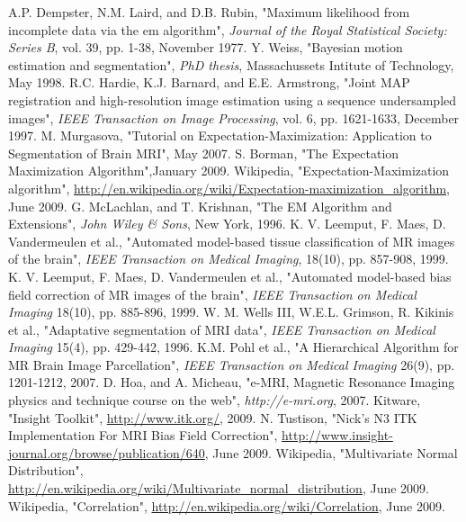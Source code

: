 \begin{thebibliography}{9999}%
%
A.P. Dempster, N.M. Laird, and D.B. Rubin, "Maximum likelihood from incomplete data via the em algorithm", \textsl{Journal of the Royal Statistical Society: Series B}, vol. 39, pp. 1-38, November 1977.
%
Y. Weiss, "Bayesian motion estimation and segmentation", \textsl{PhD thesis}, Massachussets Intitute of Technology, May 1998.
%
R.C. Hardie, K.J. Barnard, and E.E. Armstrong, "Joint MAP registration and high-resolution image estimation using a sequence undersampled images", \textsl{IEEE Transaction on Image Processing}, vol. 6, pp. 1621-1633, December 1997.
%
M. Murgasova, "Tutorial on Expectation-Maximization: Application to Segmentation of Brain MRI", May 2007.
%
S. Borman, "The Expectation Maximization Algorithm",January 2009.
%
Wikipedia, "Expectation-Maximization algorithm", \url{http://en.wikipedia.org/wiki/Expectation-maximization_algorithm}, June 2009.
%
G. McLachlan, and T. Krishnan, "The EM Algorithm and Extensions", \textsl{John Wiley \& Sons}, New York, 1996.
%
K. V. Leemput, F. Maes, D. Vandermeulen et al., "Automated model-based tissue classification of MR images of the brain", \textsl{IEEE Transaction on Medical Imaging}, 18(10), pp. 857-908, 1999.
%
K. V. Leemput, F. Maes, D. Vandermeulen et al., "Automated model-based bias field correction of MR images of the brain", \textsl{IEEE Transaction on Medical Imaging} 18(10), pp. 885-896, 1999.
%
W. M. Wells III, W.E.L. Grimson, R. Kikinis et al., "Adaptative segmentation of MRI data", \textsl{IEEE Transaction on Medical Imaging} 15(4), pp. 429-442, 1996.
%
K.M. Pohl et al., "A Hierarchical Algorithm for MR Brain Image Parcellation", \textsl{IEEE Transaction on Medical Imaging} 26(9), pp. 1201-1212, 2007.
%
D. Hoa, and A. Micheau, "e-MRI, Magnetic Resonance Imaging physics and technique course on the web", \textsl{http://e-mri.org}, 2007.
%
Kitware, "Insight Toolkit", \url{http://www.itk.org/}, 2009.
%
N. Tustison, "Nick's N3 ITK Implementation For MRI Bias Field Correction", \url{http://www.insight-journal.org/browse/publication/640}, June 2009.
%
Wikipedia, "Multivariate Normal Distribution",\\ \url{http://en.wikipedia.org/wiki/Multivariate_normal_distribution}, June 2009.
%
Wikipedia, "Correlation", \url{http://en.wikipedia.org/wiki/Correlation}, June 2009.

\end{thebibliography}

